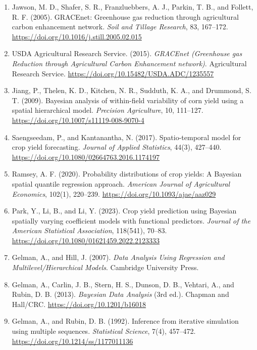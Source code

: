 \documentclass[11pt]{article}
\begin{document}
\begin{enumerate}
\renewcommand{\labelenumi}{[\theenumi]}
\setlength{\itemsep}{0pt}
\setlength{\parskip}{0pt}

\item Jawson, M. D., Shafer, S. R., Franzluebbers, A. J., Parkin, T. B., and Follett, R. F. (2005). GRACEnet: Greenhouse gas reduction through agricultural carbon enhancement network. \textit{Soil and Tillage Research}, 83, 167--172. \url{https://doi.org/10.1016/j.still.2005.02.015}

\item USDA Agricultural Research Service. (2015). \textit{GRACEnet (Greenhouse gas Reduction through Agricultural Carbon Enhancement network)}. Agricultural Research Service. \url{https://doi.org/10.15482/USDA.ADC/1235557}

\item Jiang, P., Thelen, K. D., Kitchen, N. R., Sudduth, K. A., and Drummond, S. T. (2009). Bayesian analysis of within-field variability of corn yield using a spatial hierarchical model. \textit{Precision Agriculture}, 10, 111--127. \url{https://doi.org/10.1007/s11119-008-9070-4}

\item Saengseedam, P., and Kantanantha, N. (2017). Spatio-temporal model for crop yield forecasting. \textit{Journal of Applied Statistics}, 44(3), 427--440. \url{https://doi.org/10.1080/02664763.2016.1174197}

\item Ramsey, A. F. (2020). Probability distributions of crop yields: A Bayesian spatial quantile regression approach. \textit{American Journal of Agricultural Economics}, 102(1), 220--239. \url{https://doi.org/10.1093/ajae/aaz029}

\item Park, Y., Li, B., and Li, Y. (2023). Crop yield prediction using Bayesian spatially varying coefficient models with functional predictors. \textit{Journal of the American Statistical Association}, 118(541), 70--83. \url{https://doi.org/10.1080/01621459.2022.2123333}

\item Gelman, A., and Hill, J. (2007). \textit{Data Analysis Using Regression and Multilevel/Hierarchical Models}. Cambridge University Press.

\item Gelman, A., Carlin, J. B., Stern, H. S., Dunson, D. B., Vehtari, A., and Rubin, D. B. (2013). \textit{Bayesian Data Analysis} (3rd ed.). Chapman and Hall/CRC. \url{https://doi.org/10.1201/b16018}

\item Gelman, A., and Rubin, D. B. (1992). Inference from iterative simulation using multiple sequences. \textit{Statistical Science}, 7(4), 457--472. \url{https://doi.org/10.1214/ss/1177011136}

\end{enumerate}
\end{document}
